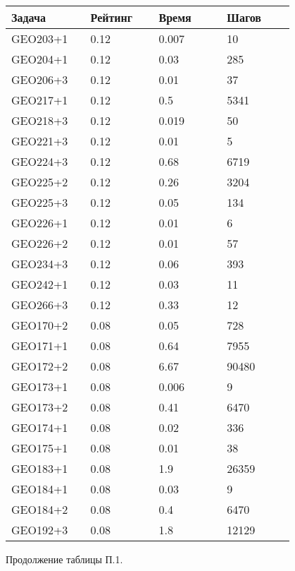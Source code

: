 \begin{longtable}[H]{|p{0.2\linewidth}|p{0.2\linewidth}|p{0.2\linewidth}|p{0.2\linewidth}|}
\hline
\textbf{Задача} & \textbf{Рейтинг} & \textbf{Время} & \textbf{Шагов} \\
\hline
GEO203+1 & 0.12 &  0.007 & 10 \\
\hline
GEO204+1 & 0.12 &  0.03 & 285 \\
\hline
GEO206+3 & 0.12 &  0.01 & 37 \\
\hline
GEO217+1 & 0.12 &  0.5 & 5341 \\
\hline
GEO218+3 & 0.12 &  0.019 & 50 \\
\hline
GEO221+3 & 0.12 &  0.01 & 5 \\
\hline
GEO224+3 & 0.12 &  0.68 & 6719 \\
\hline
GEO225+2 & 0.12 &  0.26 & 3204 \\
\hline
GEO225+3 & 0.12 &  0.05 & 134 \\
\hline
GEO226+1 & 0.12 &  0.01 & 6 \\
\hline
GEO226+2 & 0.12 &  0.01 & 57 \\
\hline
GEO234+3 & 0.12 &  0.06 & 393 \\
\hline
GEO242+1 & 0.12 &  0.03 & 11 \\
\hline
GEO266+3 & 0.12 &  0.33 & 12 \\
\hline
GEO170+2 & 0.08 & 0.05 & 728 \\
\hline
GEO171+1 & 0.08 & 0.64 & 7955 \\
\hline
GEO172+2 & 0.08 & 6.67 & 90480 \\
\hline
GEO173+1 & 0.08 & 0.006 & 9 \\
\hline
GEO173+2 & 0.08 & 0.41 & 6470 \\
\hline
GEO174+1 & 0.08 & 0.02 & 336 \\
\hline
GEO175+1 & 0.08 & 0.01 & 38 \\
\hline
GEO183+1 & 0.08 & 1.9 & 26359 \\
\hline
GEO184+1 & 0.08 & 0.03 & 9 \\
\hline
GEO184+2 & 0.08 & 0.4 & 6470 \\
\hline
GEO192+3 & 0.08 & 1.8 & 12129 \\
\hline
\end{longtable}
\begin{center}
Продолжение таблицы П.1.
\end{center}

